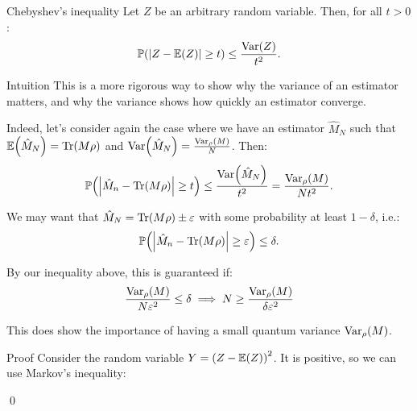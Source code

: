 \documentclass[a4paper]{article}
\begin{document}
\begin{parag}{Chebyshev's inequality}
    Let $Z$ be an arbitrary random variable. Then, for all $t > 0$: 
    \[\prob\left(\left|Z - \exval\left(Z\right)\right| \geq t\right) \leq \frac{\Var\left(Z\right)}{t^2}.\]

    \begin{subparag}{Intuition}
        This is a more rigorous way to show why the variance of an estimator matters, and why the variance shows how quickly an estimator converge.

        Indeed, let's consider again the case where we have an estimator $\hat{M}_N$ such that $\exval\left(\hat{M}_N\right) = \Tr\left(M \rho\right)$ and $\Var\left(\hat{M}_N\right) = \frac{\Var_{\rho}\left(M\right)}{N}$. Then:
        \[\prob\left(\left|\hat{M}_n - \Tr\left(M \rho\right)\right| \geq t\right) \leq \frac{\Var\left(\hat{M}_N\right)}{t^2} = \frac{\Var_{\rho}\left(M\right)}{N t^2}.\]

        We may want that $\hat{M}_N = \Tr\left(M \rho\right) \pm \epsilon$ with some probability at least $1 - \delta$, i.e.: 
        \[\prob\left(\left|\hat{M}_n - \Tr\left(M \rho\right)\right| \geq \epsilon\right) \leq \delta.\]

        By our inequality above, this is guaranteed if:
        \[\frac{\Var_{\rho}\left(M\right)}{N \epsilon^2} \leq \delta \implies N \geq \frac{\Var_{\rho}\left(M\right)}{\delta \epsilon^2}\]

        This does show the importance of having a small quantum variance $\Var_{\rho}\left(M\right)$.
    \end{subparag}

    \begin{subparag}{Proof}
       Consider the random variable $Y = \left(Z - \exval\left(Z\right)\right)^2$. It is positive, so we can use Markov's inequality: 

       \qed
    \end{subparag}
\end{parag}
\end{document}
